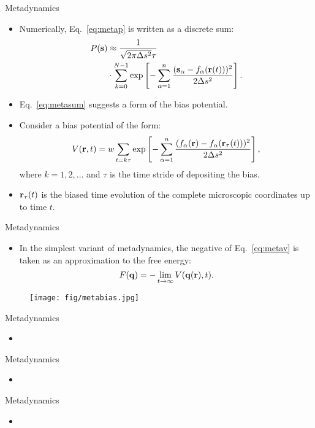 \documentclass[10pt]{beamer}
\begin{document}
\begin{frame}{Metadynamics}
\begin{itemize}
\setlength\itemsep{1em}
  \item Numerically, Eq.~\ref{eq:metap} is written as a discrete sum:
  \begin{align}
    P({\bf s}) &\approx \frac{1}{\sqrt{2\pi\Delta s^2}\tau} \nonumber\\
           &\cdot \sum_{k=0}^{N-1} \exp\left[ -\sum_{\alpha=1}^n \frac{({\bf s}_\alpha - f_\alpha({\bf r}(t)))^2}{2\Delta s^2} \right].
    \label{eq:metasum}
  \end{align}
  \item Eq.~\ref{eq:metasum} suggests a form of the bias potential.
  \item Consider a bias potential of the form:
  \begin{equation}
    V({\bf r},t) = w \sum_{t=k\tau} \exp\left[ -\sum_{\alpha=1}^n \frac{(f_\alpha({\bf r}) - f_\alpha({\bf r}_\tau(t)))^2}{2\Delta s^2} \right],
    \label{eq:metav}
  \end{equation}
  where $k=1,2,\dots$ and $\tau$ is the time stride of depositing the bias.
  \item ${\bf r}_\tau(t)$ is the biased time evolution of the complete microscopic coordinates up to time $t$.
\end{itemize}
\end{frame}

\begin{frame}{Metadynamics}
\begin{itemize}
\setlength\itemsep{1em}
  \item In the simplest variant of metadynamics, the negative of Eq.~\ref{eq:metav} is taken as an approximation to the free energy:
  \begin{equation}
    F(\mathbf{q}) = -\lim_{t\rightarrow\infty} V(\mathbf{q}({\bf r}), t).
  \end{equation}
\end{itemize}
\begin{figure}
  \texttt{[image: fig/metabias.jpg]}
\end{figure}
\end{frame}

\begin{frame}{Metadynamics}
\begin{itemize}
\setlength\itemsep{1em}
  \item
\end{itemize}
\end{frame}

\begin{frame}{Metadynamics}
\begin{itemize}
\setlength\itemsep{1em}
  \item
\end{itemize}
\end{frame}

\begin{frame}{Metadynamics}
\begin{itemize}
\setlength\itemsep{1em}
  \item
\end{itemize}
\end{frame}
\end{document}

